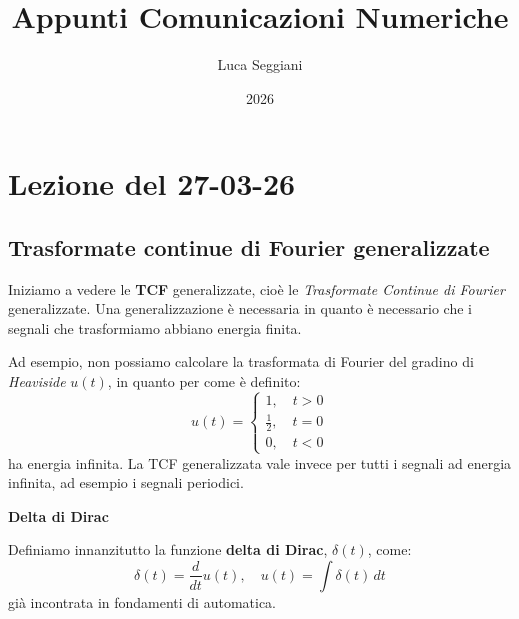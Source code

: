 \documentclass[a4paper,11pt]{article}
\title{Appunti Comunicazioni Numeriche}
\author{Luca Seggiani}
\date{2026}
\begin{document}
\section{Lezione del 27-03-26}

\thispagestyle{empty}
\pagestyle{fancy}

\subsection{Trasformate continue di Fourier generalizzate}
Iniziamo a vedere le \textbf{TCF} generalizzate, cioè le \textit{Trasformate Continue di Fourier} generalizzate. Una generalizzazione è necessaria in quanto è necessario che i segnali che trasformiamo abbiano energia finita.

Ad esempio, non possiamo calcolare la trasformata di Fourier del gradino di \textit{Heaviside} $u(t)$, in quanto per come è definito:
$$
u(t) =
\begin{cases}
	1, \quad t > 0 \\
	\frac{1}{2}, \quad t = 0 \\
	0, \quad t < 0
\end{cases}
$$
ha energia infinita. La TCF generalizzata vale invece per tutti i segnali ad energia infinita, ad esempio i segnali periodici.

\par\smallskip

\noindent
\textbf{\textsf{Delta di Dirac}}

\noindent
Definiamo innanzitutto la funzione \textbf{delta di Dirac}, $\delta(t)$, come:
$$
\delta(t) = \frac{d}{dt} u(t), \quad u(t) = \int \delta(t) \, dt
$$
già incontrata in fondamenti di automatica. 
\end{document}
